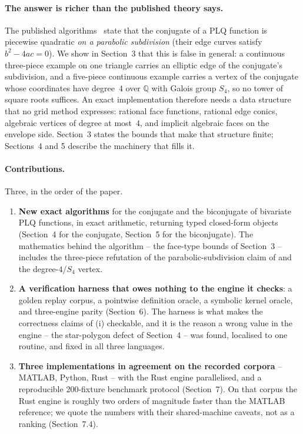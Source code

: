 \documentclass[11pt]{article}
\theoremstyle{definition}
\newcommand{\Q}{\mathbb{Q}}
\begin{document}
\paragraph{The answer is richer than the published theory says.}
The published algorithms~\cite{KARMARKAR-25,KARMARKAR-25a} state that the
conjugate of a PLQ function is piecewise quadratic \emph{on a parabolic
subdivision} (their edge curves satisfy $b^2-4ac=0$). We show in Section~3
that this is false in general: a continuous three-piece example on one triangle
carries an elliptic edge of the conjugate's subdivision, and a
five-piece continuous example carries a vertex of the conjugate whose
coordinates have degree~$4$ over $\Q$ with Galois group $S_4$, so no tower of
square roots suffices.
 An exact implementation therefore needs a data structure that no
grid method expresses: rational face functions, rational edge conics, algebraic
vertices of degree at most~$4$, and implicit algebraic faces on the envelope
side. Section~3 states the bounds that make that structure finite; Sections~4
and 5 describe the machinery that fills it.

\paragraph{Contributions.}
Three, in the order of the paper.
\begin{enumerate}[label=(\roman*), leftmargin=*]
\item \textbf{New exact algorithms} for the conjugate and the biconjugate of
  bivariate PLQ functions, in exact arithmetic, returning typed closed-form
  objects (Section~4 for the conjugate, Section~5 for the biconjugate). The
  mathematics behind the algorithm -- the face-type bounds of Section~3 --
  includes the three-piece refutation of the parabolic-subdivision claim of
  \citet{KARMARKAR-25} and the degree-$4$/$S_4$ vertex.
\item \textbf{A verification harness that owes nothing to the engine it
  checks}: a golden replay corpus, a pointwise definition oracle, a symbolic
  kernel oracle, and three-engine parity (Section~6). The harness is what makes
  the correctness claims of (i) checkable, and it is the reason a wrong value in
  the engine -- the star-polygon defect of Section~4 -- was found, localised to
  one routine, and fixed in all three languages.
\item \textbf{Three implementations in agreement on the recorded corpora} -- MATLAB, Python, Rust -- with
  the Rust engine parallelised, and a reproducible 200-fixture benchmark
  protocol (Section~7). On that corpus the Rust engine is roughly two orders of
  magnitude faster than the MATLAB reference; we quote the numbers with their
  shared-machine caveats, not as a ranking (Section~7.4).
\end{enumerate}
\end{document}
